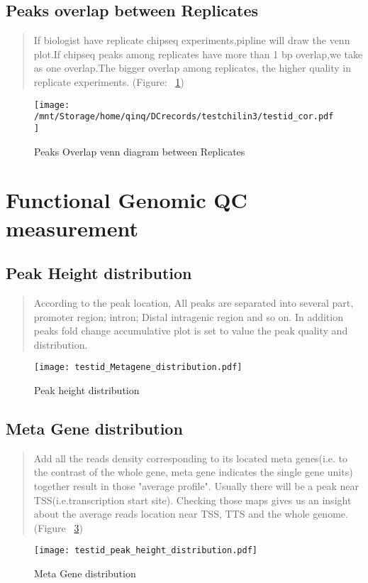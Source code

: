 \documentclass[11pt,a4paper]{article}
\begin{document}
\subsection{Peaks overlap between Replicates}
\begin{quotation}
If biologist have replicate chipseq experiments,pipline will draw the venn plot.If chipseq peaks  among replicates have more than 1 bp overlap,we take as one overlap.The bigger overlap among replicates, the higher quality in replicate experiments. (Figure: ~\ref{fig:venn})
\end{quotation}
\begin{figure}[h]
        \caption{Peaks Overlap venn diagram between Replicates} \label{fig:venn}
        \setlength{\abovecaptionskip}{0pt}
        \setlength{\belowcaptionskip}{10pt}
        \centering
        {\texttt{[image: /mnt/Storage/home/qinq/DCrecords/testchilin3/testid\_cor.pdf]}}
\end{figure}
\newpage

\section{Functional Genomic QC measurement}
\subsection{Peak Height distribution}
\begin{quotation}
According to the peak location, All peaks are separated into several part, promoter region; intron; Distal intragenic region and so on. In addition peaks fold change accumulative plot is set to value the peak quality and distribution. 
\end{quotation}
\begin{figure}[h] 
        \caption{Peak height distribution} \label{Peakdist}
        \setlength{\abovecaptionskip}{0pt} 
        \setlength{\belowcaptionskip}{0pt}
        \centering
        {\texttt{[image: testid\_Metagene\_distribution.pdf]}}
\end{figure}
\newpage

\subsection{Meta Gene distribution}
\begin{quotation}
Add all the reads density corresponding to its located meta genes(i.e. to the contrast of the whole gene, meta gene indicates the single gene units) together result in those "average profile". Usually there will be a peak near TSS(i.e.transcription start site). Checking those maps gives us an insight about the average reads location near TSS, TTS and the whole genome.(Figure ~\ref{Meta})
\end{quotation}
\begin{figure}[h] 
        \caption{Meta Gene distribution} \label{Meta}
        \setlength{\abovecaptionskip}{0pt} 
        \setlength{\belowcaptionskip}{10pt}
        \centering
        {\texttt{[image: testid\_peak\_height\_distribution.pdf]}}
\end{figure}
\newpage
\end{document}
